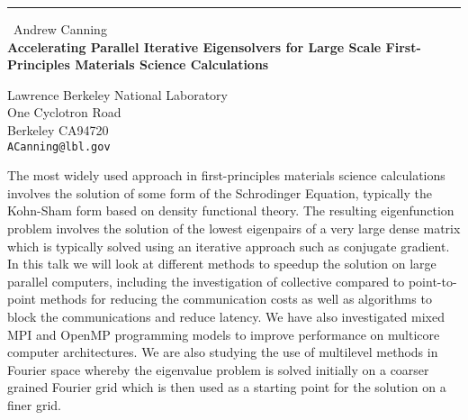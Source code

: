 \documentclass{report}
\begin{document}
\begin{center}
\rule{6in}{1pt} \
{\large Andrew Canning \\
{\bf Accelerating Parallel Iterative Eigensolvers for Large Scale First-Principles Materials Science Calculations }}

Lawrence Berkeley National Laboratory \\ One Cyclotron Road \\ Berkeley CA94720
\\
{\tt ACanning@lbl.gov}\end{center}

The most widely used approach in first-principles materials science
calculations involves the solution of some form of the Schrodinger
Equation, typically the Kohn-Sham form based on density functional
theory. The resulting eigenfunction problem involves the solution of the
lowest eigenpairs of a very large dense matrix which is typically solved
using an iterative approach such as conjugate gradient. In this talk we
will look at different methods to speedup the solution on large parallel
computers, including the investigation of collective compared to
point-to-point methods for reducing the communication costs as well as
algorithms to block the communications and reduce latency. We have also
investigated mixed MPI and OpenMP programming models to improve
performance on multicore computer architectures. We are also studying the
use of multilevel methods in Fourier space whereby the eigenvalue problem
is solved initially on a coarser grained Fourier grid which is then used
as a starting point for the solution on a finer grid.
\end{document}
